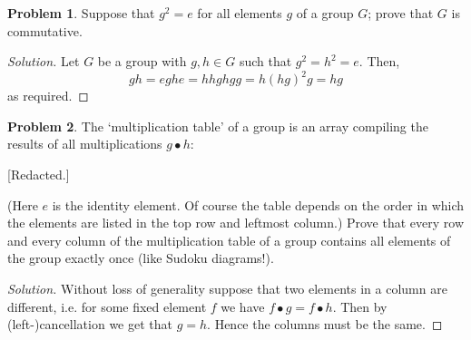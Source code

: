 \documentclass[fontsize=14pt]{scrartcl}
\theoremstyle{definition}
\newtheorem{problem-internal}{Problem}[subsection]
\newenvironment{problem}{
  \medskip
  \begin{problem-internal}
}{
  \end{problem-internal}
}
\newenvironment{solution}{
  \begin{proof}[Solution]
  \vspace{-8px}
  \setlength{\parskip}{4px}
  \setlength{\parindent}{0px}
}{
  \end{proof}
}
\begin{document}
\begin{problem}
Suppose that $g^2 = e$ for all elements $g$ of a group $G$; prove that $G$ is
commutative.
\end{problem}
\begin{solution}
Let $G$ be a group with $g,h\in G$ such that $g^2=h^2=e$. Then,
%
\[ gh = eghe = hhghgg = h(hg)^2g = hg \]
%
as required.
\end{solution}


\begin{problem}
The `multiplication table' of a group is an array compiling the results of all
multiplications $g\bullet h$:

[Redacted.]

(Here $e$ is the identity element. Of course the table depends on the order in
which the elements are listed in the top row and leftmost column.) Prove that
every row and every column of the multiplication table of a group contains all
elements of the group exactly once (like Sudoku diagrams!).
\end{problem}
\begin{solution}
Without loss of generality suppose that two elements in a column are different,
i.e. for some fixed element $f$ we have $f\bullet g = f\bullet h$. Then by
(left-)cancellation we get that $g=h$. Hence the columns must be the same.
\end{solution}
\end{document}
